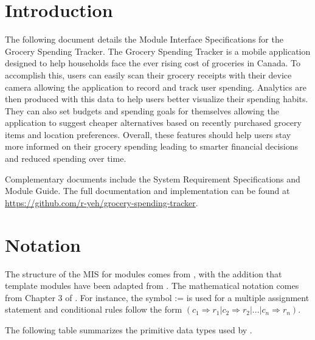 \documentclass[12pt, titlepage]{article}
\begin{document}
\newpage

\tableofcontents

\newpage


\section{Introduction}

The following document details the Module Interface Specifications for
the Grocery Spending Tracker. The Grocery Spending Tracker is a mobile application
designed to help households face the ever rising cost of groceries in Canada.
To accomplish this, users can easily scan their grocery receipts with their device camera allowing the
application to record and track user spending. Analytics are then produced
with this data to help users better visualize their spending habits. They can also
set budgets and spending goals for themselves allowing the application to
suggest cheaper alternatives based on recently purchased grocery items and
location preferences. Overall, these features should help users stay more informed on their
grocery spending leading to smarter financial decisions and reduced spending over time.

Complementary documents include the System Requirement Specifications
and Module Guide.  The full documentation and implementation can be
found at \url{https://github.com/r-yeh/grocery-spending-tracker}.

\section{Notation}

The structure of the MIS for modules comes from \citet{HoffmanAndStrooper1995},
with the addition that template modules have been adapted from
\cite{GhezziEtAl2003}.  The mathematical notation comes from Chapter 3 of
\citet{HoffmanAndStrooper1995}.  For instance, the symbol := is used for a
multiple assignment statement and conditional rules follow the form $(c_1
\Rightarrow r_1 | c_2 \Rightarrow r_2 | ... | c_n \Rightarrow r_n )$.

The following table summarizes the primitive data types used by \progname. 
\end{document}
